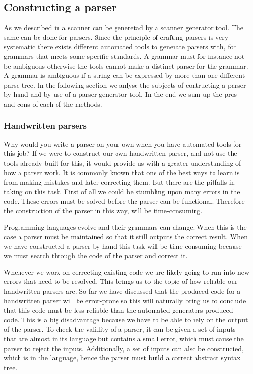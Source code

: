 \subsection{Constructing a parser}
\label{subsec:constructingaparser}
As we described in  a scanner can be generetad by a
scanner generator tool. The same can be done for parsers. Since the principle of
crafting parsers is very systematic there exists different automated tools to
generate parsers with, for grammars that meets some specific standards. A
grammar must for instance not be ambiguous otherwise the tools cannot make a
distinct parser for the grammar. A grammar is ambiguous if a string can be
expressed by more than one different parse tree. In the following section we
anlyse the subjects of contructing a parser by hand and by use of a parser
generator tool. In the end we sum up the pros and cons of each of the methods. 

\subsubsection{Handwritten parsers}
\label{subsec:handwrittenparsers}
Why would you write a parser on your own when you have automated tools for this
job? If we were to construct our own handwritten parser, and not use the tools
already built for this, it would provide us with a greater understanding of how
a parser work. It is commonly known that one of the best ways to learn is from
making mistakes and later correcting them. But there are the pitfalls in taking
on this task. First of all we could be stumbling upon many errors in the code.
These errors must be solved before the parser can be functional. Therefore the
construction of the parser in this way, will be time-consuming.

Programming languages evolve and their grammars can change. When this is the
case a parser must be maintained so that it still outputs the correct result.
When we have constructed a parser by hand this task will be time-consuming
because we must search through the code of the parser and correct it. 

Whenever we work on correcting existing code we are likely going to run into new
errors that need to be resolved. This brings us to the topic of how reliable our
handwritten parsers are. So far we have discussed that the produced code for a
handwritten parser will be error-prone so this will naturally bring us to
conclude that this code must be less reliable than the automated generators
produced code. This is a big disadvantage because we have to be able to rely on
the output of the parser. To check the validity of a parser, it can be given a
set of inputs that are almost in its language but contains a small error, which
must cause the parser to reject the inputs. Additionally, a set of inputs can
also be constructed, which is in the language, hence the parser must build a
correct abstract syntax tree.


